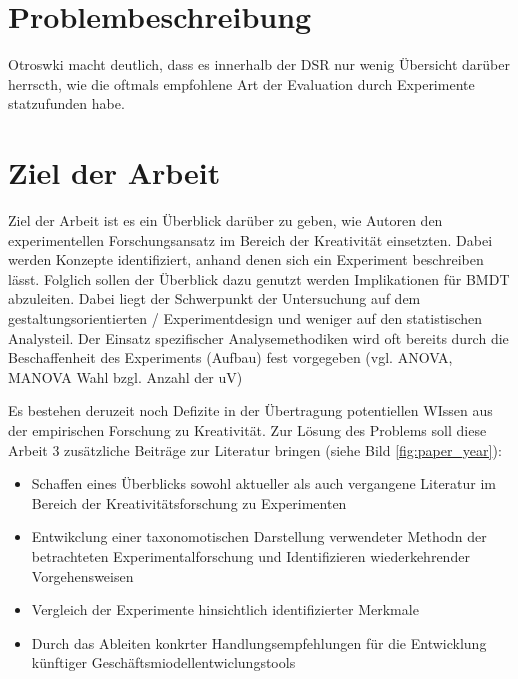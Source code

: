  
\begin{figure}[h]
 \centering
 \resizebox{\textwidth}{!}{%
 }
 \caption{}
 \end{figure}



\section{Problembeschreibung} \label{eqn:1}

Otroswki macht deutlich, dass es innerhalb der DSR nur wenig Übersicht darüber herrscth, wie die oftmals empfohlene Art der Evaluation durch Experimente statzufunden habe.

\section{Ziel der Arbeit}

Ziel der Arbeit ist es ein Überblick darüber zu geben, wie Autoren den experimentellen Forschungsansatz im Bereich der Kreativität einsetzten. Dabei werden Konzepte identifiziert, anhand denen sich ein Experiment beschreiben lässt. Folglich sollen der Überblick dazu genutzt werden Implikationen für BMDT abzuleiten.
Dabei liegt der Schwerpunkt der Untersuchung auf dem gestaltungsorientierten / Experimentdesign und weniger auf den statistischen Analysteil. Der Einsatz spezifischer Analysemethodiken wird oft bereits durch die Beschaffenheit des Experiments (Aufbau) fest vorgegeben (vgl. ANOVA, MANOVA Wahl bzgl. Anzahl der uV)


Es bestehen deruzeit noch Defizite in der Übertragung potentiellen WIssen aus der empirischen Forschung zu Kreativität.
Zur Lösung des Problems soll diese Arbeit 3 zusätzliche Beiträge zur Literatur bringen (siehe Bild \ref{fig:paper_year}):
\begin{itemize}
\item Schaffen eines Überblicks sowohl aktueller als auch vergangene Literatur im Bereich der Kreativitätsforschung zu Experimenten
\item Entwikclung einer taxonomotischen Darstellung verwendeter Methodn  der betrachteten Experimentalforschung und Identifizieren wiederkehrender Vorgehensweisen
\item Vergleich der Experimente hinsichtlich identifizierter Merkmale
\item Durch das Ableiten konkrter Handlungsempfehlungen für die Entwicklung künftiger Geschäftsmiodellentwiclungstools
\end{itemize}




